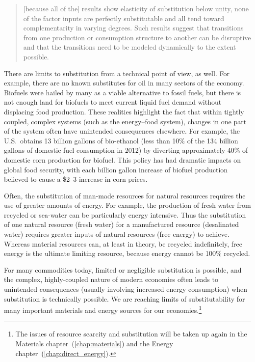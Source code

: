 \begin{quote}
	[because all of the] results show elasticity of substitution below unity, 
	none of the factor inputs are perfectly substitutable and 
	all tend toward complementarity in varying degrees. 
	Such results suggest that transitions 
	from one production or consumption structure to another 
	can be disruptive and that the transitions 
	need to be modeled dynamically to the extent possible.\cite[p.~8]{de-Wit:2013aa}
\end{quote}

There are limits to substitution from a technical point of view, as well.
For example, there are no known substitutes for oil 
in many sectors of the economy.\cite{Hirsch2005}
Biofuels were hailed by many as a viable alternative to fossil fuels, but
there is not enough land for biofuels to meet current liquid fuel demand
without displacing food production.
These realities highlight the fact that within tightly coupled, 
complex systems (such as the energy--food system),
changes in one part of the system often have unintended consequences elsewhere.
For example, 
the U.S.\ obtains 13 billion gallons of bio-ethanol 
(less than 10\% of the 134 billion gallons of domestic fuel consumption in 2012)
by diverting approximately 40\%
of domestic corn production for biofuel.\cite{EIA2014, USDA2014}
This policy has had dramatic impacts on global food security,
with each billion gallon increase of biofuel production believed to cause
a \$2--3 increase in corn prices.\cite{Kemick2013}

Often, the substitution of man-made resources for natural resources
requires the use of greater amounts of energy.
For example, the production of fresh water from recycled or sea-water
can be particularly energy intensive.
Thus the substitution of one natural resource (fresh water)
for a manufactured resource (desalinated water)
requires greater inputs of natural resources (free energy) to achieve.
Whereas material resources can, at least in theory,
be recycled indefinitely,
free energy is the ultimate limiting resource, 
because energy cannot be 100\% recycled.

For many commodities today, limited or negligible substitution is possible,
and the complex, highly-coupled nature of modern economies
often leads to unintended consequences (usually involving increased energy consumption)
when substitution is technically possible.
We are reaching limits of substitutability for many important 
materials and energy sources for our 
economies.\footnote{The issues of resource scarcity and substitution
	will be taken up again in 
	the Materials chapter~(\ref{chap:materials}) and
	the Energy chapter~(\ref{chap:direct_energy}).}


